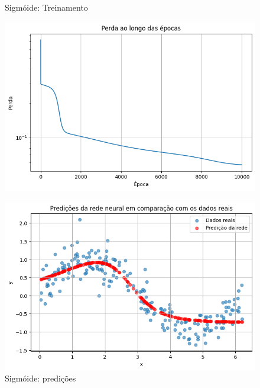 \begin{figure}[htb]
	\centering
	\begin{minipage}{0.45\textwidth}
	\centering
	\caption{Sigmóide: Treinamento} \label{tarefa01:sigmoide:treinamento}
	\includegraphics[width=\textwidth]{./0803_imgs/png-241110-142600634-18420033062344975583.png}
	\end{minipage}
	\hfill
	\begin{minipage}{0.45\textwidth}
	\centering
	\caption{Sigmóide: predições} \label{tarefa01:simoide:predicoes}
	\includegraphics[width=\textwidth]{./0803_imgs/png-241110-143132585-16405151944787820073.png}
	\end{minipage}
\end{figure}

